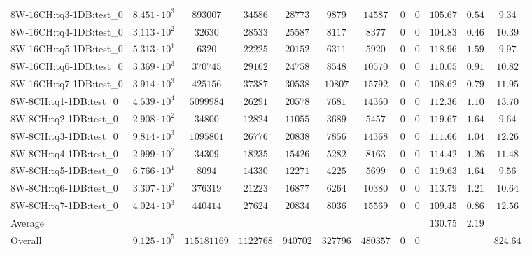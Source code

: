 \begin{tabular}{|l|c|c|c|c|c|c|c|c|c|c|c|}
8W-16CH:tq3-1DB:test\_0  & $ 8.451 \cdot 10^{3} $ & $ 893007    $ & $ 34586   $ & $ 28773  $ & $ 9879   $ & $ 14587  $ & $ 0 $ & $ 0 $ & $ 105.67      $ & $ 0.54    $ & $ 9.34    $ \\
8W-16CH:tq4-1DB:test\_0  & $ 3.113 \cdot 10^{2} $ & $ 32630     $ & $ 28533   $ & $ 25587  $ & $ 8117   $ & $ 8377   $ & $ 0 $ & $ 0 $ & $ 104.83      $ & $ 0.46    $ & $ 10.39   $ \\
8W-16CH:tq5-1DB:test\_0  & $ 5.313 \cdot 10^{1} $ & $ 6320      $ & $ 22225   $ & $ 20152  $ & $ 6311   $ & $ 5920   $ & $ 0 $ & $ 0 $ & $ 118.96      $ & $ 1.59    $ & $ 9.97    $ \\
8W-16CH:tq6-1DB:test\_0  & $ 3.369 \cdot 10^{3} $ & $ 370745    $ & $ 29162   $ & $ 24758  $ & $ 8548   $ & $ 10570  $ & $ 0 $ & $ 0 $ & $ 110.05      $ & $ 0.91    $ & $ 10.82   $ \\
8W-16CH:tq7-1DB:test\_0  & $ 3.914 \cdot 10^{3} $ & $ 425156    $ & $ 37387   $ & $ 30538  $ & $ 10807  $ & $ 15792  $ & $ 0 $ & $ 0 $ & $ 108.62      $ & $ 0.79    $ & $ 11.95   $ \\
8W-8CH:tq1-1DB:test\_0   & $ 4.539 \cdot 10^{4} $ & $ 5099984   $ & $ 26291   $ & $ 20578  $ & $ 7681   $ & $ 14360  $ & $ 0 $ & $ 0 $ & $ 112.36      $ & $ 1.10    $ & $ 13.70   $ \\
8W-8CH:tq2-1DB:test\_0   & $ 2.908 \cdot 10^{2} $ & $ 34800     $ & $ 12824   $ & $ 11055  $ & $ 3689   $ & $ 5457   $ & $ 0 $ & $ 0 $ & $ 119.67      $ & $ 1.64    $ & $ 9.64    $ \\
8W-8CH:tq3-1DB:test\_0   & $ 9.814 \cdot 10^{3} $ & $ 1095801   $ & $ 26776   $ & $ 20838  $ & $ 7856   $ & $ 14368  $ & $ 0 $ & $ 0 $ & $ 111.66      $ & $ 1.04    $ & $ 12.26   $ \\
8W-8CH:tq4-1DB:test\_0   & $ 2.999 \cdot 10^{2} $ & $ 34309     $ & $ 18235   $ & $ 15426  $ & $ 5282   $ & $ 8163   $ & $ 0 $ & $ 0 $ & $ 114.42      $ & $ 1.26    $ & $ 11.48   $ \\
8W-8CH:tq5-1DB:test\_0   & $ 6.766 \cdot 10^{1} $ & $ 8094      $ & $ 14330   $ & $ 12271  $ & $ 4225   $ & $ 5699   $ & $ 0 $ & $ 0 $ & $ 119.63      $ & $ 1.64    $ & $ 9.56    $ \\
8W-8CH:tq6-1DB:test\_0   & $ 3.307 \cdot 10^{3} $ & $ 376319    $ & $ 21223   $ & $ 16877  $ & $ 6264   $ & $ 10380  $ & $ 0 $ & $ 0 $ & $ 113.79      $ & $ 1.21    $ & $ 10.64   $ \\
8W-8CH:tq7-1DB:test\_0   & $ 4.024 \cdot 10^{3} $ & $ 440414    $ & $ 27624   $ & $ 20834  $ & $ 8036   $ & $ 15569  $ & $ 0 $ & $ 0 $ & $ 109.45      $ & $ 0.86    $ & $ 12.56   $ \\
\hline
Average                 & $                    $ & $           $ & $         $ & $        $ & $        $ & $        $ & $   $ & $   $ & $ 130.75      $ & $ 2.19    $ & $         $ \\
\hline
Overall                 & $ 9.125 \cdot 10^{5} $ & $ 115181169 $ & $ 1122768 $ & $ 940702 $ & $ 327796 $ & $ 480357 $ & $ 0 $ & $ 0 $ & $             $ & $         $ & $ 824.64  $ \\
\hline
\end{tabular}
